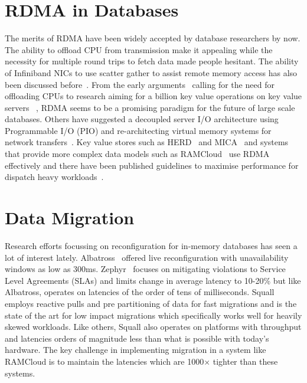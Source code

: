 \section{RDMA in Databases}
The merits of RDMA have been widely accepted by database researchers by now. The 
ability to offload CPU from transmission make it appealing while the necessity for 
multiple round trips to fetch data made people hesitant. The ability of Infiniband NICs to 
use scatter gather to assist remote memory access has also been discussed before~\cite{zerocopy04}.
From the early arguments~\cite{rdmacase} calling for the need for offloading CPUs to 
research aiming for a billion key value operations on key value servers ~\cite{rdmabillion},
RDMA seems to be a promising paradigm for the future of large scale databases. Others have suggested
a decoupled server I/O architecture using Programmable I/O (PIO) and re-architecting virtual 
memory systems for network transfers~\cite{hicamp}. Key value stores
such as HERD~\cite{herd} and MICA~\cite{mica} and systems that provide more complex
data models such as RAMCloud~\cite{ramcloud} use RDMA effectively and there have been 
published guidelines to maximise performance for dispatch heavy workloads~\cite{rdma}.

\section{Data Migration}
Research efforts focussing on reconfiguration for in-memory databases has seen a lot of 
interest lately. Albatross~\cite{albatross} offered live reconfiguration with unavailability windows as low as 
300ms. Zephyr~\cite{zephyr} focuses on mitigating violations to Service Level Agreements (SLAs) and limits 
change in average latency to 10-20\% but like Albatross, operates on latencies of the order of tens of milliseconds.  
Squall~\cite{squall} employs reactive pulls and pre partitioning
of data for fast migrations and is the state of the art for low impact migrations which specifically works well for 
heavily skewed workloads. Like others, Squall also operates on platforms with throughput and latencies orders of 
magnitude less than what is possible with today's hardware. The key challenge in implementing migration in a system 
like RAMCloud is to maintain the latencies which are 1000$\times$ tighter than these systems.

